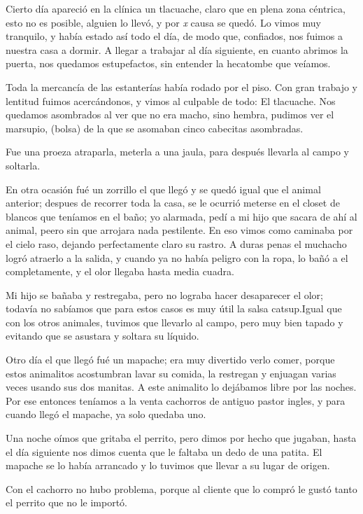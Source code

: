 \documentclass[letterpaper, 12pt]{book}
\begin{document}
Cierto día apareció en la clínica un tlacuache, claro que en plena zona céntrica, esto no es posible, alguien lo llevó, y por \textit{x } causa se quedó. Lo vimos muy tranquilo, y había estado así todo el día, de modo que, confiados, nos fuimos a nuestra casa a dormir. A llegar a trabajar al día siguiente, en cuanto abrimos la puerta, nos quedamos estupefactos, sin entender la hecatombe que veíamos.

Toda la mercancía de las estanterías había rodado por el piso. Con gran trabajo y lentitud fuimos acercándonos, y vimos al culpable de todo: El tlacuache. Nos quedamos asombrados al ver que no era macho, sino hembra, pudimos ver el marsupio, (bolsa) de la que se asomaban cinco cabecitas asombradas.

Fue una proeza atraparla, meterla a una jaula, para después llevarla al campo y soltarla.

En otra ocasión fué un zorrillo el que llegó y se quedó igual que el animal anterior; despues de recorrer toda la casa, se le ocurrió meterse en el closet de blancos que teníamos en el baño; yo alarmada, pedí a mi hijo que sacara de ahí al animal, peero sin que arrojara nada pestilente. En eso vimos como caminaba por el cielo raso, dejando perfectamente claro su rastro. A duras penas el muchacho logró atraerlo a la salida, y cuando ya no había peligro con la ropa, lo bañó a el completamente, y el olor llegaba hasta media cuadra.

Mi hijo se bañaba y restregaba, pero no lograba hacer desaparecer el olor; todavía no sabíamos que para estos casos es muy útil la salsa catsup.Igual que con los otros animales, tuvimos que llevarlo al campo, pero muy bien tapado y evitando que se asustara y soltara su líquido. 

Otro día el que llegó fué un mapache; era muy divertido verlo comer, porque estos animalitos acostumbran lavar su comida, la restregan y enjuagan varias veces usando sus dos manitas. A este animalito lo dejábamos libre por las noches. Por ese entonces teníamos a la venta cachorros de antiguo pastor ingles, y para cuando llegó el mapache, ya solo quedaba uno.

Una noche oímos que gritaba el perrito, pero dimos por hecho que jugaban, hasta el día siguiente nos dimos cuenta que le faltaba un dedo de una patita. El mapache se lo había arrancado y lo tuvimos que llevar a su lugar de origen.

Con el cachorro no hubo problema, porque al cliente que lo compró le gustó tanto el perrito que no le importó.
\end{document}
